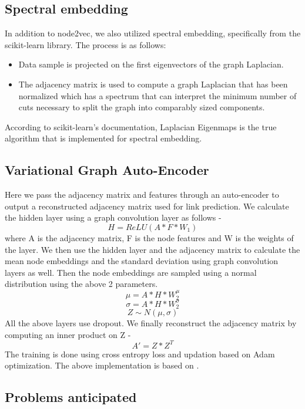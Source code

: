 \documentclass[10pt,twocolumn,letterpaper]{article}
\begin{document}
\subsection{Spectral embedding}

In addition to node2vec, we also utilized spectral embedding, specifically from the scikit-learn library. The process is as follows: \cite{spectral-embed}

\begin{itemize}
    \item Data sample is projected on the first eigenvectors of the graph Laplacian.
    \item The adjacency matrix is used to compute a graph Laplacian that has been normalized which has a spectrum that can interpret the minimum number of cuts necessary to split the graph into comparably sized components.
\end{itemize}

According to scikit-learn's documentation, Laplacian Eigenmaps is the true algorithm that is implemented for spectral embedding.

\subsection{Variational Graph Auto-Encoder}

Here we pass the adjacency matrix and features through an auto-encoder to output a reconstructed adjacency matrix used for link prediction. We calculate the hidden layer using a graph convolution layer as follows - 
\[
H = ReLU(A*F*W_1)
\]
where A is the adjacency matrix, F is the node features and W is the weights of the layer. We then use the hidden layer and the adjacency matrix to calculate the mean node embeddings and the standard deviation using graph convolution layers as well. Then the node embeddings are sampled using a normal distribution using the above 2 parameters.
\[
\mu = A*H*W^\mu_2
\]
\[
\sigma = A*H*W^\sigma_2
\]
\[
Z \sim N(\mu, \sigma)
\]
All the above layers use dropout. We finally reconstruct the adjacency matrix by computing an inner product on Z - 
\[
A' = Z*Z^T
\]
The training is done using cross entropy loss and updation based on Adam optimization. The above implementation is based on \cite{lucas-hu}.

\subsection{Problems anticipated}
\end{document}
